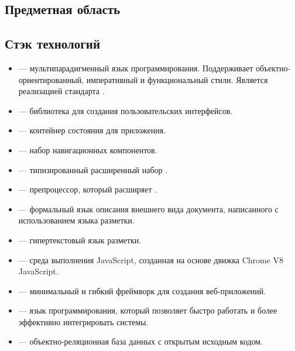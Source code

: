 \subsection{Предметная область}


\subsection{Стэк технологий}
\begin{itemize}
    \item \textcite{wiki:js} --- мультипарадигменный язык программирования. Поддерживает объектно-ориентированный, императивный и функциональный стили. Является реализацией стандарта \textcite{wiki:es}.
    \item \textcite{react} --- \textcite{wiki:js} библиотека для создания пользовательских интерфейсов.
    \item \textcite{redux} --- контейнер состояния для \textcite{wiki:js} приложения.
    \item \textcite{react-router} --- набор навигационных компонентов.
    \item \textcite{ts} --- типизированный расширенный набор \textcite{wiki:js}.
    \item \textcite{scss} --- препроцессор, который расширяет \textcite{wiki:css}.
    \item \textcite{wiki:css} --- формальный язык описания внешнего вида документа, написанного с использованием языка разметки.
    \item \textcite{wiki:html} --- гипертекстовый язык разметки.
    \item \textcite{node.js} --- среда выполнения JavaScript, созданная на основе движка Chrome V8 JavaScript.
    \item \textcite{express} --- минимальный и гибкий \textcite{node.js} фреймворк для создания веб-приложений.
    \item \textcite{python} --- язык программирования, который позволяет быстро работать и более эффективно интегрировать системы.
    \item \textcite{postgres} --- объектно-реляционная база данных с открытым исходным кодом.
\end{itemize}

